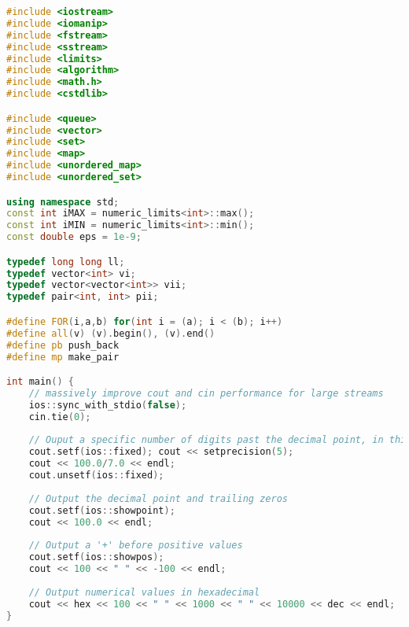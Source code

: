 \begin{lstlisting}[language=C++]
#include <iostream>
#include <iomanip>
#include <fstream>
#include <sstream>
#include <limits>
#include <algorithm>
#include <math.h>
#include <cstdlib>

#include <queue>
#include <vector>
#include <set>
#include <map>
#include <unordered_map>
#include <unordered_set>

using namespace std;
const int iMAX = numeric_limits<int>::max();
const int iMIN = numeric_limits<int>::min();
const double eps = 1e-9;

typedef long long ll;
typedef vector<int> vi;
typedef vector<vector<int>> vii;
typedef pair<int, int> pii;

#define FOR(i,a,b) for(int i = (a); i < (b); i++)
#define all(v) (v).begin(), (v).end()
#define pb push_back
#define mp make_pair

int main() {
	// massively improve cout and cin performance for large streams
	ios::sync_with_stdio(false);
	cin.tie(0);
	
	// Ouput a specific number of digits past the decimal point, in this case 5    
	cout.setf(ios::fixed); cout << setprecision(5);
	cout << 100.0/7.0 << endl;
	cout.unsetf(ios::fixed);
    
	// Output the decimal point and trailing zeros
	cout.setf(ios::showpoint);
	cout << 100.0 << endl;
    
	// Output a '+' before positive values
	cout.setf(ios::showpos);
	cout << 100 << " " << -100 << endl;
    
	// Output numerical values in hexadecimal
	cout << hex << 100 << " " << 1000 << " " << 10000 << dec << endl;
}
\end{lstlisting}